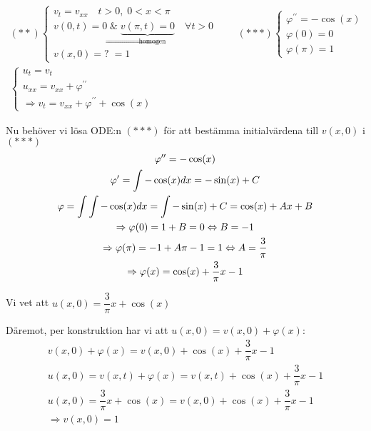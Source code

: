 \begin{equation*}
  \begin{gathered}(**)
    \begin{cases*}
      v_t = v_{xx}\quad t>0,\; 0<x<\pi\\
      v(0,t) = 0\;\&\;\underbrace{v(\pi,t)=0}_{\text{$\Rightarrow$ homogen}}\quad\forall t>0\\
      v(x,0)=?\;=1
    \end{cases*}\qquad(***)
    \begin{cases*}
      \varphi^{\prime\prime} = -\cos(x)\\
      \varphi(0) = 0\\
      \varphi(\pi) = 1
    \end{cases*}\\
    \begin{cases*}
      u_t=v_t\\
      u_{xx} = v_{xx}+\varphi^{\prime\prime}\\
      \Rightarrow v_t = v_{xx} +\varphi^{\prime\prime}+\cos(x)
    \end{cases*}
  \end{gathered}
\end{equation*}
\par\bigskip
\noindent Nu behöver vi lösa ODE:n $(***)$ för att bestämma initialvärdena till $v(x,0)$ i $(***)$ 
\begin{equation*}
  \begin{gathered}
    \varphi^{\prime\prime} = -\cos(x)\\
    \varphi^{\prime} = \int-\cos(x)dx = -\sin(x)+C\\
    \varphi = \int\int-\cos(x)dx = \int-\sin(x)+C = \cos(x)+Ax+B\\
    \Rightarrow \varphi(0) = 1+B = 0\Leftrightarrow B = -1\\
    \Rightarrow \varphi(\pi) = -1+A\pi-1 = 1\Leftrightarrow A = \dfrac{3}{\pi}\\
    \Rightarrow \varphi(x) = \cos(x)+\dfrac{3}{\pi}x-1
  \end{gathered}
\end{equation*}
\par\bigskip
\noindent Vi vet att $u(x,0) = \dfrac{3}{\pi}x+\cos(x)$\par
\noindent Däremot, per konstruktion har vi att $ u(x,0) = v(x,0)+\varphi(x)$:
\begin{equation*}
  \begin{gathered}
    v(x,0)+\varphi(x) = v(x,0)+\cos(x)+\dfrac{3}{\pi}x-1\\
    u(x,0) = v(x,t)+\varphi(x) = v(x,t)+\cos(x)+\dfrac{3}{\pi}x-1\\
    u(x,0) = \dfrac{3}{\pi}x+\cos(x) = v(x,0)+\cos(x)+\dfrac{3}{\pi}x-1\\
    \Rightarrow v(x,0) = 1
  \end{gathered}
\end{equation*}
